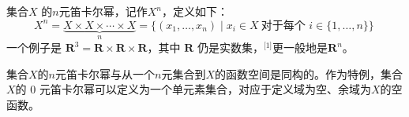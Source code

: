 集合\( X \) 的\(n\)元笛卡尔幂，记作\( X^n \)，定义如下：
\[
X^n = \underbrace{X \times X \times \cdots \times X}_{n} = \{(x_1, \dots, x_n) \mid x_i \in X\ \text{对于每个 } i \in \{1, \dots, n\} \}~
\]
一个例子是 \( \mathbf{R}^3 = \mathbf{R} \times \mathbf{R} \times \mathbf{R} \)，其中 \( \mathbf{R} \) 仍是实数集，\(^\text{[1]}\)更一般地是\( \mathbf{R}^n \)。

集合\( X \)的\(n\)元笛卡尔幂与从一个\(n\)元集合到\( X \)的函数空间是同构的。作为特例，集合\( X \)的 0 元笛卡尔幂可以定义为一个单元素集合，对应于定义域为空、余域为\( X \)的空函数。